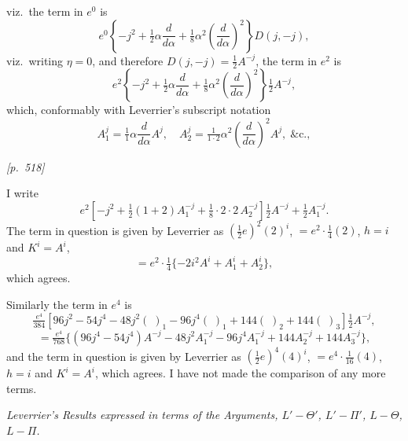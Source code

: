 \documentclass[11pt]{article}
\begin{document}
\medskip

viz.\ the term in $e^0$ is
\[
e^0\left\{-j^2+\tfrac{1}{2}\alpha\frac{d}{d\alpha}+\tfrac{1}{8}\alpha^2\left(\frac{d}{d\alpha}\right)^2\right\}D(j,-j),
\]
viz.\ writing $\eta=0$, and therefore $D(j,-j)=\tfrac{1}{2}A^{-j}$, the
term in $e^2$ is
\[
e^2\left\{-j^2+\tfrac{1}{2}\alpha\frac{d}{d\alpha}+\tfrac{1}{8}\alpha^2\left(\frac{d}{d\alpha}\right)^2\right\}\tfrac{1}{2}A^{-j},
\]
which, conformably with Leverrier's subscript notation
\[
A_1^j=\tfrac{1}{1}\alpha\frac{d}{d\alpha}A^j,\quad A_2^j=\tfrac{1}{1\cdot2}\alpha^2\left(\frac{d}{d\alpha}\right)^2A^j,\;\&\mathrm{c}.,
\]


\bigskip
\noindent\textit{[p.~518]}

\medskip

I write
\[
e^2\left[-j^2+\tfrac{1}{2}(1+2)A_1^{-j}+\tfrac{1}{8}\cdot2\cdot 2\,A_2^{-j}\right]\tfrac{1}{2}A^{-j}+\tfrac{1}{2}A_1^{-j}.
\]
The term in question is given by Leverrier as $(\tfrac{1}{2}e)^2(2)^i$,
$=e^2\cdot\tfrac{1}{4}(2)$, $h=i$ and $K^i=A^i$,
\[
=e^2\cdot\tfrac{1}{4}\{-2i^2A^i+A_1^i+A_2^i\},
\]
which agrees.

\medskip

Similarly the term in $e^4$ is
\[
\tfrac{e^4}{384}\left[96j^2-54j^4-48j^2(\;)_1-96j^4(\;)_1+144(\;)_2+144(\;)_3\right]\tfrac{1}{2}A^{-j},
\]
\[
=\tfrac{e^4}{768}\{(96j^4-54j^4)A^{-j}-48j^2A_1^{-j}-96j^4A_1^{-j}+144A_2^{-j}+144A_3^{-j}\},
\]
and the term in question is given by Leverrier as $(\tfrac{1}{2}e)^4(4)^i$,
$=e^4\cdot\tfrac{1}{16}(4)$, $h=i$ and $K^i=A^i$,
which agrees. I have not made the comparison of any more terms.

\medskip

\begin{center}
\textit{Leverrier's Results expressed in terms of the Arguments, $L'-\Theta'$, $L'-\Pi'$, $L-\Theta$, $L-\Pi$.}
\end{center}

\medskip
\end{document}

